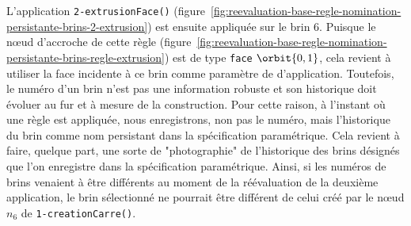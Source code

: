 L'application \texttt{2-\allowbreak{}extrusion\-Face()}
(figure~\ref{fig:reevaluation-base-regle-nomination-persistante-brins-2-extrusion})
est ensuite appliquée sur le brin \(6\). %
Puisque le n\oe ud d'accroche de cette règle (figure~\ref{fig:reevaluation-base-regle-nomination-persistante-brins-regle-extrusion}) est de type \texttt{face} \(\orbit{0,1}\), cela revient à utiliser la face incidente à ce brin comme paramètre de d'application. %
Toutefois, le numéro d'un brin n'est pas une information robuste et son
historique doit évoluer au fur et à mesure de la construction. %
Pour cette raison, à l'instant où une règle est appliquée, nous enregistrons, non pas le numéro, mais l'historique du brin comme nom persistant dans la spécification paramétrique. %
Cela revient à faire, quelque part, une sorte de "photographie" de l'historique des brins désignés que l'on enregistre dans la spécification paramétrique.
 Ainsi, si les numéros de brins venaient à être différents au moment de la réévaluation de la deuxième application, le brin sélectionné ne pourrait être différent de celui créé par le n\oe ud \(n_{6}\) de
\texttt{1-\allowbreak{}creation\-Carre()}.

